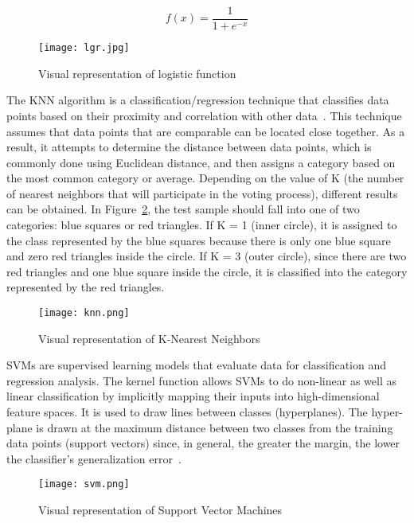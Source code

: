 \begin{equation}\label{eq:5}
    f(x) = \frac{1}{1+e^{-x}}
\end{equation}

\begin{figure}[htbp]
    \centering
    \texttt{[image: lgr.jpg]}
    \caption{Visual representation of logistic function~\cite{Nasteski2017AnMethods}}
    \label{fig:lgr}
\end{figure}


The \gls{KNN} algorithm is a classification/regression technique that classifies data points based on their proximity and correlation with other data~\cite{2020WhatIBM}. This technique assumes that data points that are comparable can be located close together. As a result, it attempts to determine the distance between data points, which is commonly done using Euclidean distance, and then assigns a category based on the most common category or average. Depending on the value of K (the number of nearest neighbors that will participate in the voting process), different results can be obtained. In Figure~\ref{fig:knn}, the test sample should fall into one of two categories: blue squares or red triangles. If K = 1 (inner circle), it is assigned to the class represented by the blue squares because there is only one blue square and zero red triangles inside the circle. If K = 3 (outer circle), since there are two red triangles and one blue square inside the circle, it is classified into the category represented by the red triangles.

\begin{figure}[htbp]
    \centering
    \texttt{[image: knn.png]}
    \caption{Visual representation of K-Nearest Neighbors~\cite{Bronshtein2017AMedium}}
    \label{fig:knn}
\end{figure}

\gls{SVM}s are supervised learning models that evaluate data for classification and regression analysis. The kernel function allows \gls{SVM}s to do non-linear as well as linear classification by implicitly mapping their inputs into high-dimensional feature spaces. It is used to draw lines between classes (hyperplanes). The hyper-plane is drawn at the maximum distance between two classes from the training data points (support vectors) since, in general, the greater the margin, the lower the classifier's generalization error~\cite{Mahesh2019MachineReview}.
    
\begin{figure}[htbp]
    \centering
    \texttt{[image: svm.png]}
    \caption{Visual representation of Support Vector Machines~\cite{MaquinaExplicada}}
    \label{fig:svm}
\end{figure}


